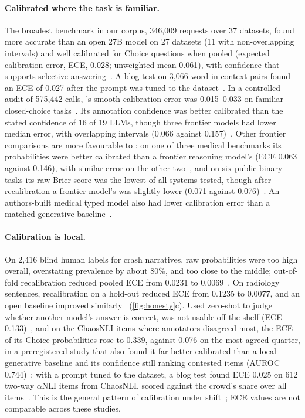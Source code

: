 \paragraph{Calibrated where the task is familiar.}
The broadest benchmark in our corpus, 346{,}009 requests over 37 datasets, found \jev{} more accurate than an open 27B model on 27 datasets (11 with non-overlapping intervals) and well calibrated for Choice questions when pooled (expected calibration error, ECE, 0.028; unweighted mean 0.061), with confidence that supports selective answering~\cite{arx37647}.
A blog test on 3{,}066 word-in-context pairs found an ECE of 0.027 after the prompt was tuned to the dataset~\cite{grazian2026calibrated}\gmark{}. In a controlled audit of 575{,}442 calls, \jev{}'s smooth calibration error was 0.015--0.033 on familiar closed-choice tasks~\cite{arx01006}.
Its annotation confidence was better calibrated than the stated confidence of 16 of 19 LLMs, though three frontier models had lower median error, with overlapping intervals (0.066 against 0.157)~\cite{arx24574}. Other frontier comparisons are more favourable to \jev{}: on one of three medical benchmarks its probabilities were better calibrated than a frontier reasoning model's (ECE 0.063 against 0.146), with similar error on the other two~\cite{arx34024}, and on six public binary tasks its raw Brier score was the lowest of all systems tested, though after recalibration a frontier model's was slightly lower (0.071 against 0.076)~\cite{zen22885291}\zmark{}. An authors-built medical typed model also had lower calibration error than a matched generative baseline~\cite{arx00381}.

\paragraph{Calibration is local.}
On 2{,}416 blind human labels for crash narratives, raw \jev{} probabilities were too high overall, overstating prevalence by about 80\%, and too close to the middle; out-of-fold recalibration reduced pooled ECE from 0.0231 to 0.0069~\cite{arx24052}.
On radiology sentences, recalibration on a hold-out reduced ECE from 0.1235 to 0.0077, and an open baseline improved similarly~\cite{arx27607} (\cref{fig:honesty}c).
Used zero-shot to judge whether another model's answer is correct, \jev{} was not usable off the shelf (ECE 0.133)~\cite{arx24881}, and on the ChaosNLI items where annotators disagreed most, the ECE of its Choice probabilities rose to 0.339, against 0.076 on the most agreed quarter, in a preregistered study that also found it far better calibrated than a local generative baseline and its confidence still ranking contested items (AUROC 0.744)~\cite{zen23032384}\zmark{}; with a prompt tuned to the dataset, a blog test found ECE 0.025 on 612 two-way $\alpha$NLI items from ChaosNLI, scored against the crowd's share over all items~\cite{grazian2026calibrated}\gmark{}.
This is the general pattern of calibration under shift~\cite{ovadia2019trust}; ECE values are not comparable across these studies.

